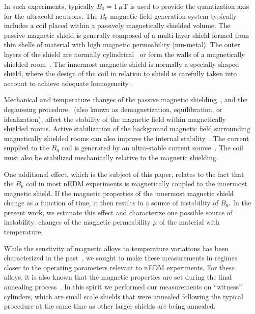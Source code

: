 \documentclass[review,number,sort&compress]{elsarticle}
\begin{document}
In such experiments, typically $B_0=1~\mu$T is used to provide the
quantization axis for the ultracold neutrons.  The $B_0$ magnetic
field generation system typically includes a coil placed within a
passively magnetically shielded volume.  The passive magnetic shield
is generally composed of a multi-layer shield formed from thin shells
of material with high magnetic permeability (mu-metal).  The outer
layers of the shield are normally
cylindrical~\cite{bib:nedm2,bib:nedm3.5} or form the walls of a
magnetically shielded room~\cite{bib:altarev2014,bib:altarev2015}.
The innermost magnetic shield is normally a specially shaped shield,
where the design of the coil in relation to shield is carefully taken
into account to achieve adequate homogeneity
\cite{bib:baker,bib:nedm3,bib:nedm5}.

Mechanical and temperature changes of the passive magnetic
shielding~\cite{bib:voigt,bib:thiel}, and the degaussing
procedure~\cite{bib:thiel,bib:altarev2015,bib:fierlinger2016} (also
known as demagnetization, equilibration, or idealization), affect the
stability of the magnetic field within magnetically shielded rooms.
Active stabilization of the background magnetic field surrounding
magnetically shielded rooms can also improve the internal
stability~\cite{bib:voigt,bib:afach,bib:franke}.  The current supplied
to the $B_0$ coil is generated by an ultra-stable current
source~\cite{bib:brys}. The coil must also be stabilized mechanically
relative to the magnetic shielding.

One additional effect, which is the subject of this paper, relates to
the fact that the $B_0$ coil in most nEDM experiments is magnetically
coupled to the innermost magnetic shield.  If the magnetic properties
of the innermost magnetic shield change as a function of time, it then
results in a source of instability of $B_0$.  In the present work, we
estimate this effect and characterize one possible source of
instability: changes of the magnetic permeability $\mu$ of the
material with temperature.

While the senstivity of magnetic alloys to temperature variations has
been characterized in the past~\cite{bib:couderchon,bib:kruppvdm}, we
sought to make these measurements in regimes closer to the operating
parameters relevant to nEDM experiments.  For these alloys, it is also
known that the magnetic properties are set during the final annealing
process~\cite{bib:gupta,bib:bozorth,bib:kruppvdm}.  In this spirit we
performed our measurements on ``witness'' cylinders, which are small
scale shields that were annealed following the typical procedure at
the same time as other larger shields are being annealed.
\end{document}
